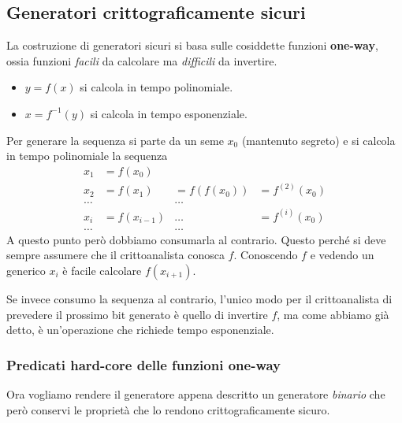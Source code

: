 \subsection{Generatori crittograficamente sicuri}
La costruzione di generatori sicuri si basa sulle cosiddette funzioni \textbf{one-way}, ossia funzioni \emph{facili} da
calcolare ma \emph{difficili} da invertire.
\begin{itemize}
	\item $y = f(x)$ si calcola in tempo polinomiale.
	\item $x = f^{-1}(y)$ si calcola in tempo esponenziale.
\end{itemize}
Per generare la sequenza si parte da un seme $x_0$ (mantenuto segreto) e si calcola in tempo polinomiale la sequenza
\[
	\begin{matrix}
		x_1   & = f(x_0)     &             &                \\
		x_2   & = f(x_1)     & = f(f(x_0)) & = f^{(2)}(x_0) \\
		\dots &              & \dots       &                \\
		x_i   & = f(x_{i-1}) & \dots       & = f^{(i)}(x_0) \\
		\dots &              & \dots       &
	\end{matrix}
\]
A questo punto per\`o dobbiamo consumarla al contrario. Questo perch\'e si deve sempre assumere che il crittoanalista
conosca $f$. Conoscendo $f$ e vedendo un generico $x_i$ \`e facile calcolare $f(x_{i+1})$.

Se invece consumo la sequenza al contrario, l'unico modo per il crittoanalista di prevedere il prossimo bit generato
\`e quello di invertire $f$, ma come abbiamo gi\`a detto, \`e un'operazione che richiede tempo esponenziale.

\subsubsection{Predicati hard-core delle funzioni one-way}
Ora vogliamo rendere il generatore appena descritto un generatore \emph{binario} che per\`o conservi le propriet\`a che
lo rendono crittograficamente sicuro.